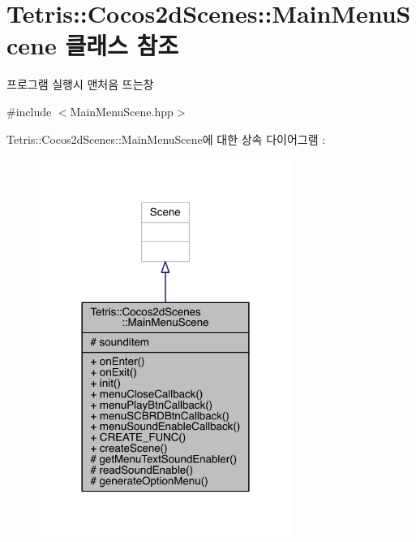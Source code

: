 \hypertarget{class_tetris_1_1_cocos2d_scenes_1_1_main_menu_scene}{}\section{Tetris\+:\+:Cocos2d\+Scenes\+:\+:Main\+Menu\+Scene 클래스 참조}
\label{class_tetris_1_1_cocos2d_scenes_1_1_main_menu_scene}


프로그램 실행시 맨처음 뜨는창  




{\ttfamily \#include $<$Main\+Menu\+Scene.\+hpp$>$}



Tetris\+:\+:Cocos2d\+Scenes\+:\+:Main\+Menu\+Scene에 대한 상속 다이어그램 \+: 
\nopagebreak
\begin{figure}[H]
\begin{center}
\leavevmode
\includegraphics[width=234pt]{class_tetris_1_1_cocos2d_scenes_1_1_main_menu_scene__inherit__graph}
\end{center}
\end{figure}


